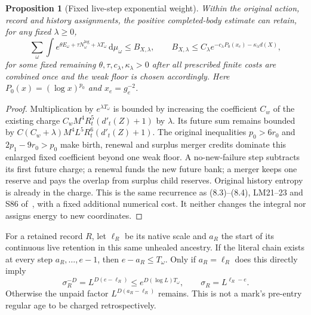 \documentclass[11pt,letterpaper]{article}
\numberwithin{equation}{section}
\theoremstyle{plain}
\newtheorem{proposition}[theorem]{Proposition}
\theoremstyle{remark}\newtheorem{remark}[theorem]{Scope}
\newcommand{\dd}{\,\mathrm d}\newcommand{\eps}{\varepsilon}
\begin{document}
\begin{proposition}[Fixed live-step exponential weight]
Within the original action, record and history assignments, the positive
completed-body estimate can retain, for any fixed $\lambda\ge0$,
\begin{equation}
 \sum_\omega\int
 e^{\theta E_\omega+\tau N_\omega^{\log}+\lambda T_\omega}
 \dd\mu_\omega
 \le B_{X,\lambda},\qquad
 B_{X,\lambda}\le C_\lambda
 e^{-c_\lambda P_0(x_e)-\kappa_\lambda d(X)},
 \label{eq:timebank}
\end{equation}
for some fixed remaining $\theta,\tau,c_\lambda,\kappa_\lambda>0$ after
all prescribed finite costs are combined once and the weak floor is chosen
accordingly. Here $P_0(x)=(\log x)^{p_0}$ and $x_e=g_e^{-2}$.
\end{proposition}
\begin{proof}
Multiplication by $e^{\lambda T_\omega}$ is bounded by increasing the
coefficient $C_w$ of the existing charge
$C_wM^4R_t^5(d'_t(Z)+1)$ by $\lambda$. Its future sum remains bounded by
$C(C_w+\lambda)M^4L^5R_t^6(d'_t(Z)+1)$.
The original inequalities $p_0>6r_0$ and
$2p_1-9r_0>p_0$ make birth, renewal and surplus merger credits dominate
this enlarged fixed coefficient beyond one weak floor. A no-new-failure
step subtracts its first future charge; a renewal funds the new future
bank; a merger keeps one reserve and pays the overlap from surplus child
reserves. Original history entropy is already in the charge.
This is the same recurrence as (8.3)--(8.4), LM21--23 and S86 of~\cite[pp.~137--138, 774, 614]{W},
with a fixed additional numerical cost. It neither changes the
integral nor assigns energy to new coordinates.
\end{proof}

For a retained record $R$, let $\ell_R$ be its native scale and $a_R$ the
start of its continuous live retention in this same unhealed ancestry.
If the literal chain exists at every step $a_R,\ldots,e-1$, then
$e-a_R\le T_\omega$. Only if $a_R=\ell_R$ does this directly imply
\begin{equation}
 \sigma_R^{-D}=L^{D(e-\ell_R)}
 \le e^{D(\log L)T_\omega},\qquad \sigma_R=L^{\ell_R-e}.
 \label{eq:depth}
\end{equation}
Otherwise the unpaid factor $L^{D(a_R-\ell_R)}$ remains. This is not a
mark's pre-entry regular age to be charged retrospectively.
\end{document}
